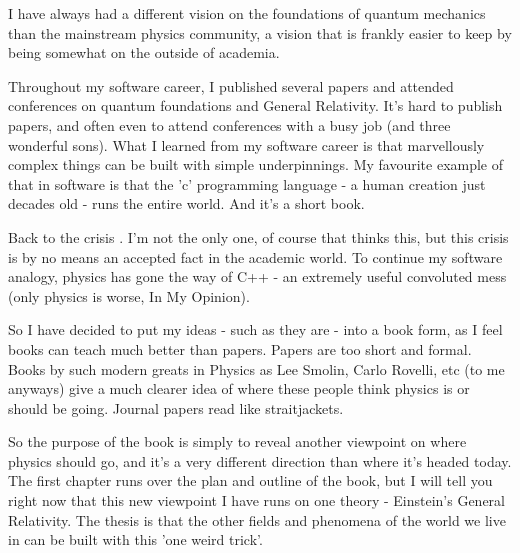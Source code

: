 \documentclass[../rzero]{subfiles}
\begin{document}
I have always had a different vision on the foundations of quantum mechanics than the mainstream physics community, a vision that is frankly easier to keep by being somewhat on the outside of academia.  

Throughout my software career, I published several papers and attended conferences on quantum foundations and General Relativity. It's hard to publish papers, and often even to attend conferences with a busy job (and three wonderful sons). What I learned from my software career is that marvellously complex things can be built with simple underpinnings. My favourite example of that in software is that the 'c' programming language - a human creation just decades old - runs the entire world. And it's a short book\cite{kernighan2002c}. 

Back to the crisis \cite{smolinWhatAreWe2017}. I'm not the only one, of course that thinks this, but this crisis is by no means an accepted fact in the academic world. To continue my software analogy, physics has gone the way of C++ - an extremely useful convoluted mess (only physics is worse, In My Opinion).   

So I have decided to put my ideas - such as they are - into a book form, as I feel books can teach much better than papers. Papers are too short and formal. Books by such modern greats in Physics as Lee Smolin, Carlo Rovelli, etc (to me anyways) give a much clearer idea of where these people think physics is or should be going. Journal papers read like straitjackets. 

So the purpose of the book is simply to reveal another viewpoint on where physics should go, and it's a very different direction than where it's headed today. The first chapter runs over the plan and outline of the book, but I will tell you right now that this new viewpoint I have runs on one theory - Einstein's General Relativity. The thesis is that the other fields and phenomena of the world we live in can be built with this 'one weird trick'. 
\end{document}
